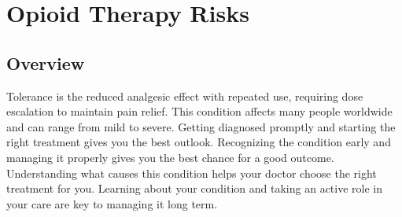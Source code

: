 \chapter{Opioid Therapy Risks}
\label{sec:Opioid Therapy Risks}

\section{Overview}
Tolerance is the reduced analgesic effect with repeated use, requiring dose escalation to maintain pain relief. This condition affects many people worldwide and can range from mild to severe. Getting diagnosed promptly and starting the right treatment gives you the best outlook. Recognizing the condition early and managing it properly gives you the best chance for a good outcome. Understanding what causes this condition helps your doctor choose the right treatment for you. Learning about your condition and taking an active role in your care are key to managing it long term.

